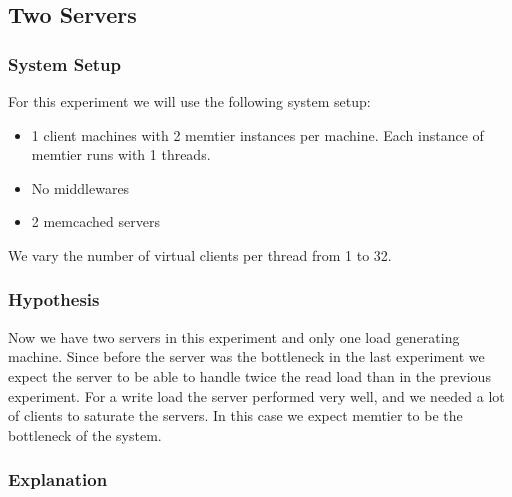 \documentclass[11pt,a4paper]{article}
\begin{document}
\subsection{Two Servers}
%
\subsubsection{System Setup}
%
For this experiment we will use the following system setup:
%
\begin{itemize}
	\item 1 client machines with 2 memtier instances per machine. Each instance of memtier runs with 1 threads.
	\item No middlewares
	\item 2 memcached servers
\end{itemize}
%
We vary the number of virtual clients per thread from 1 to 32.
%
\subsubsection{Hypothesis}
%
Now we have two servers in this experiment and only one load generating machine.
%
Since before the server was the bottleneck in the last experiment we expect the server to be able to handle twice the read load than in the previous experiment.
%
For a write load the server performed very well, and we needed a lot of clients to saturate the servers.
%
In this case we expect memtier to be the bottleneck of the system.
%
\subsubsection{Explanation}
%
\end{document}
